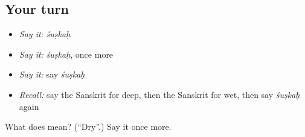 \subsection*{Your turn}
\begin{itemize}
\raggedright
  \item \emph{Say it:} \emph{śuṣkaḥ}
  \item \emph{Say it:} \emph{śuṣkaḥ}, once more
  \item \emph{Say it:} say \emph{śuṣkaḥ}
  \item \emph{Recall:} say the Sanskrit for deep, then the Sanskrit for wet, then say \emph{śuṣkaḥ} again
\end{itemize}

\begin{tcolorbox}[breakable,colback=teal!4,colframe=teal!35!black,title={Before you move on}]
What does  mean? (\textquotedblleft{}Dry\textquotedblright{}.) Say it once more.
\end{tcolorbox}

